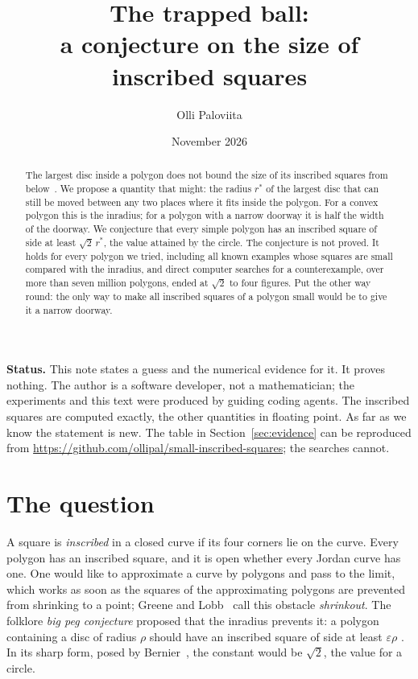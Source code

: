 \documentclass[11pt,a4paper]{article}
\title{The trapped ball:\\ a conjecture on the size of inscribed squares}
\author{Olli Paloviita}
\date{November 2026}
\theoremstyle{definition}\newtheorem{definition}{Definition}
\theoremstyle{remark}\newtheorem{remark}{Remark}
\begin{document}
\maketitle

\begin{abstract}
The largest disc inside a polygon does not bound the size of its inscribed
squares from below~\cite{small}. We propose a quantity that might: the radius
$r^*$ of the largest disc that can still be moved between any two places where
it fits inside the polygon. For a convex polygon this is the inradius; for a
polygon with a narrow doorway it is half the width of the doorway. We conjecture
that every simple polygon has an inscribed square of side at least
$\sqrt2\,r^*$, the value attained by the circle. The conjecture is not proved.
It holds for every polygon we tried, including all known examples whose squares
are small compared with the inradius, and direct computer searches for a
counterexample, over more than seven million polygons, ended at $\sqrt2$ to
four figures. Put the other way round: the only way to make all inscribed
squares of a polygon small would be to give it a narrow doorway.
\end{abstract}

\noindent\textbf{Status.} This note states a guess and the numerical evidence
for it. It proves nothing. The author is a software developer, not a
mathematician; the experiments and this text were produced by guiding coding
agents. The inscribed squares are computed exactly, the other quantities in
floating point. As far as we know the statement is new. The table in
Section~\ref{sec:evidence} can be reproduced from
\url{https://github.com/ollipal/small-inscribed-squares}; the searches cannot.

\section{The question}

A square is \emph{inscribed} in a closed curve if its four corners lie on the
curve. Every polygon has an inscribed square, and it is open whether every
Jordan curve has one. One would like to approximate a curve by polygons and pass
to the limit, which works as soon as the squares of the approximating polygons
are prevented from shrinking to a point; Greene and Lobb~\cite{gl} call this
obstacle \emph{shrinkout}. The folklore \emph{big peg conjecture}
proposed that the inradius prevents it: a polygon containing a disc of radius
$\rho$ should have an inscribed square of side at least $\varepsilon\rho$
\cite{matschke-survey,schwartz}. In its sharp form, posed by
Bernier~\cite{bernier}, the constant would be $\sqrt2$, the value for a circle.
\end{document}
